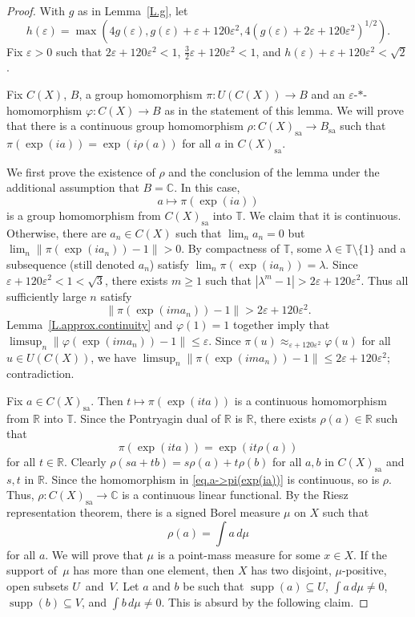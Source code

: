 \documentclass[11pt]{amsproc}
\newcommand{\bbT}{\mathbb T}
\newcommand{\bbR}{\mathbb R}
\newcommand{\bbC}{\mathbb C}
\DeclareMathOperator{\supp}{supp}
\theoremstyle{definition}
\theoremstyle{plain}
\theoremstyle{remark}
\begin{document}
\begin{proof}
	With $g$ as in Lemma~\ref{L.g},  let 
	\[
	h(\varepsilon)=\max(4g(\varepsilon),  g(\varepsilon)+\varepsilon+120\varepsilon^2, 4 (g(\varepsilon)+2\varepsilon+120\varepsilon^2)^{1/2}).
	\] 
	Fix $\varepsilon>0$ such that    $2 \varepsilon+120\varepsilon^2<1$, $\frac 32 \varepsilon+120\varepsilon^2<1$, and $h(\varepsilon)+\varepsilon+120\varepsilon^2<\sqrt 2$. 
	
	Fix $C(X)$, $B$, a group homomorphism  $\pi\colon U(C(X))\to B$ and an $\varepsilon$-$*$-homomorphism $\varphi\colon C(X)\to B$ as in the statement of this lemma.  
	We will prove that %
	there is a continuous group homomorphism $\rho\colon C(X)_{\textrm{sa}}\to B_{\textrm{sa}}$ such that $		\pi(\exp(ia))=\exp(i\rho(a))$
		for all $a$ in $C(X)_{\textrm{sa}}$.
	
	We first prove the existence of $\rho$ and the conclusion of the lemma under the additional assumption that $B=\bbC$. 
In this case, 	\begin{equation}\label{eq.a->pi(exp(ia))}
		a\mapsto \pi(\exp(ia)) 
	\end{equation}
	is a group homomorphism from $C(X)_{\textrm{sa}}$ into $\bbT$. 
	We claim that it is continuous. 
	Otherwise, there are $a_n\in C(X)$ such that $\lim_n a_n=0$ but $\lim_n \|\pi(\exp(ia_n))-1\|>0$. By compactness of $\bbT$, some $\lambda\in \bbT\setminus \{1\}$ and a subsequence (still denoted $a_n$) satisfy $\lim_n \pi(\exp(ia_n))=\lambda$. Since $\varepsilon+120\varepsilon^2<1<\sqrt 3$, there exists $m\geq 1$ such that $|\lambda^m-1|>2\varepsilon+120\varepsilon^2$. Thus all sufficiently large $n$ satisfy 
	\[
	\|\pi(\exp(i m a_n))-1\|>2\varepsilon+120\varepsilon^2.
	\]
	Lemma~\ref{L.approx.continuity} and $\varphi(1)=1$ together imply  that $\limsup_n \|\varphi(\exp(i m a_n))-1\|\leq \varepsilon$. Since $\pi(u)\approx_{\varepsilon+120\varepsilon^2} \varphi(u)$ for all $u\in U(C(X))$,  we have 
	$\limsup_n \|\pi(\exp(i m a_n))-1\|\leq 2\varepsilon+120\varepsilon^2$; contradiction.
	
	Fix $a\in C(X)_{\textrm{sa}}$. Then $t\mapsto \pi(\exp(ita))$ is a continuous homomorphism from $\bbR$ into $\bbT$. Since the Pontryagin dual of $\bbR$ is $\bbR$, there exists $\rho(a)\in \bbR$ such that 
	\[
	\pi(\exp(ita))=\exp(it \rho(a))
	\]
	for all $t\in \bbR$. 
	Clearly $\rho(sa+tb)=s\rho(a)+t\rho(b)$ for all $a,b$ in $C(X)_{\textrm{sa}}$ and $s,t$ in $\bbR$.  
	Since the homomorphism in \eqref{eq.a->pi(exp(ia))} is  continuous, so is $\rho$. 
	Thus, $\rho\colon C(X)_{\textrm{sa}}\to \bbC$ is a continuous linear functional. 
	By the Riesz representation theorem, there is a signed Borel measure $\mu$ on $X$ such that 
	\[
	\rho(a)=\int a\, d\mu
	\]
	for all $a$. We will prove that $\mu$ is a point-mass measure for some $x\in X$. 
	If the support of~$\mu$ has more than one element, then $X$ has two disjoint, $\mu$-positive,  open subsets $U$~and~$V$. Let $a$ and $b$ be such that $\supp(a)\subseteq U$, $\int a\,d\mu\neq 0$, $\supp(b)\subseteq V$, and $\int b\, d\mu\neq 0$. This is absurd by the following claim. 
	

\end{proof}
\end{document}
